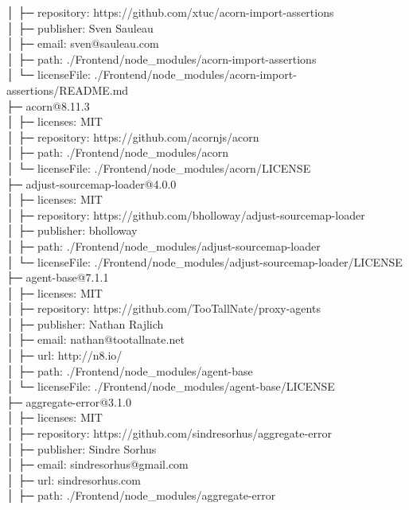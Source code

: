 │  ├─ repository: https://github.com/xtuc/acorn-import-assertions\\
│  ├─ publisher: Sven Sauleau\\
│  ├─ email: sven@sauleau.com\\
│  ├─ path: ./Frontend/node\_modules/acorn-import-assertions\\
│  └─ licenseFile: ./Frontend/node\_modules/acorn-import-assertions/README.md\\
├─ acorn@8.11.3\\
│  ├─ licenses: MIT\\
│  ├─ repository: https://github.com/acornjs/acorn\\
│  ├─ path: ./Frontend/node\_modules/acorn\\
│  └─ licenseFile: ./Frontend/node\_modules/acorn/LICENSE\\
├─ adjust-sourcemap-loader@4.0.0\\
│  ├─ licenses: MIT\\
│  ├─ repository: https://github.com/bholloway/adjust-sourcemap-loader\\
│  ├─ publisher: bholloway\\
│  ├─ path: ./Frontend/node\_modules/adjust-sourcemap-loader\\
│  └─ licenseFile: ./Frontend/node\_modules/adjust-sourcemap-loader/LICENSE\\
├─ agent-base@7.1.1\\
│  ├─ licenses: MIT\\
│  ├─ repository: https://github.com/TooTallNate/proxy-agents\\
│  ├─ publisher: Nathan Rajlich\\
│  ├─ email: nathan@tootallnate.net\\
│  ├─ url: http://n8.io/\\
│  ├─ path: ./Frontend/node\_modules/agent-base\\
│  └─ licenseFile: ./Frontend/node\_modules/agent-base/LICENSE\\
├─ aggregate-error@3.1.0\\
│  ├─ licenses: MIT\\
│  ├─ repository: https://github.com/sindresorhus/aggregate-error\\
│  ├─ publisher: Sindre Sorhus\\
│  ├─ email: sindresorhus@gmail.com\\
│  ├─ url: sindresorhus.com\\
│  ├─ path: ./Frontend/node\_modules/aggregate-error\\
